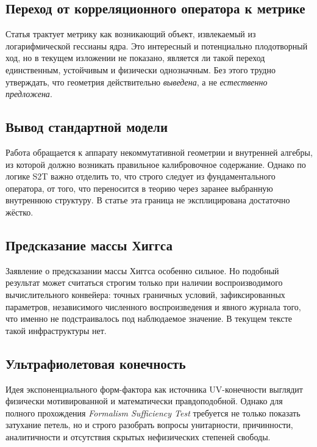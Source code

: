\documentclass[12pt,a4paper]{article}
\begin{document}
\subsection{Переход от корреляционного оператора к метрике}

Статья трактует метрику как возникающий объект, извлекаемый из логарифмической гессианы ядра. Это интересный и потенциально плодотворный ход, но в текущем изложении не показано, является ли такой переход единственным, устойчивым и физически однозначным. Без этого трудно утверждать, что геометрия действительно \emph{выведена}, а не \emph{естественно предложена}.

\subsection{Вывод стандартной модели}

Работа обращается к аппарату некоммутативной геометрии и внутренней алгебры, из которой должно возникать правильное калибровочное содержание. Однако по логике S2T важно отделить то, что строго следует из фундаментального оператора, от того, что переносится в теорию через заранее выбранную внутреннюю структуру. В статье эта граница не эксплицирована достаточно жёстко.

\subsection{Предсказание массы Хиггса}

Заявление о предсказании массы Хиггса особенно сильное. Но подобный результат может считаться строгим только при наличии воспроизводимого вычислительного конвейера: точных граничных условий, зафиксированных параметров, независимого численного воспроизведения и явного журнала того, что именно не подстраивалось под наблюдаемое значение. В текущем тексте такой инфраструктуры нет.

\subsection{Ультрафиолетовая конечность}

Идея экспоненциального форм-фактора как источника UV-конечности выглядит физически мотивированной и математически правдоподобной. Однако для полного прохождения \emph{Formalism Sufficiency Test} требуется не только показать затухание петель, но и строго разобрать вопросы унитарности, причинности, аналитичности и отсутствия скрытых нефизических степеней свободы.
\end{document}
